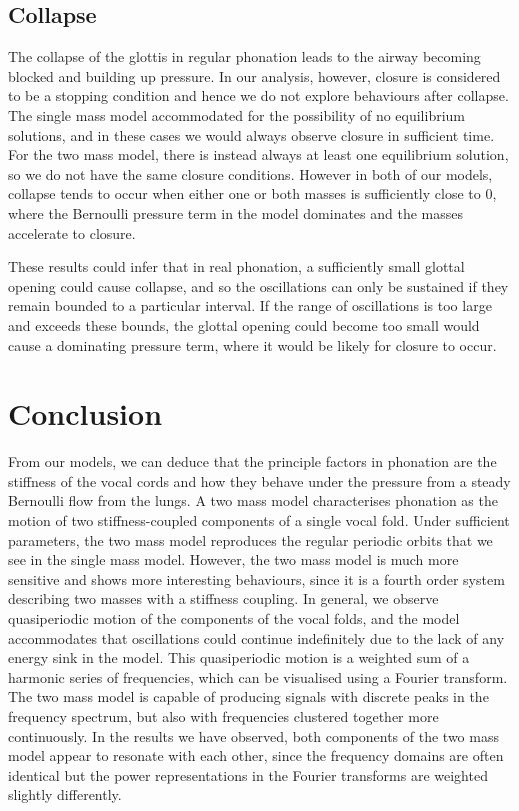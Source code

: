 \documentclass{report}
\begin{document}
\subsection{Collapse}

The collapse of the glottis in regular phonation leads to the airway becoming blocked and building up pressure.
In our analysis, however, closure is considered to be a stopping condition and hence we do not explore behaviours after collapse.
The single mass model accommodated for the possibility of no equilibrium solutions,
and in these cases we would always observe closure in sufficient time.
For the two mass model, there is instead always at least one equilibrium solution,
so we do not have the same closure conditions.
However in both of our models,
collapse tends to occur when either one or both masses is sufficiently close to $0$,
where the Bernoulli pressure term in the model dominates and the masses accelerate to closure.

These results could infer that in real phonation,
a sufficiently small glottal opening could cause collapse,
and so the oscillations can only be sustained if they remain bounded to a particular interval.
If the range of oscillations is too large and exceeds these bounds,
the glottal opening could become too small would cause a dominating pressure term,
where it would be likely for closure to occur.

\section{Conclusion}

From our models,
we can deduce that the principle factors in phonation are the stiffness of the vocal cords and how they behave under the pressure from a steady Bernoulli flow from the lungs.
A two mass model characterises phonation as the motion of two stiffness-coupled components of a single vocal fold.
Under sufficient parameters, the two mass model reproduces the regular periodic orbits that we see in the single mass model.
However, the two mass model is much more sensitive and shows more interesting behaviours,
since it is a fourth order system describing two masses with a stiffness coupling.
In general, we observe quasiperiodic motion of the components of the vocal folds,
and the model accommodates that oscillations could continue indefinitely due to the lack of any energy sink in the model.
This quasiperiodic motion is a weighted sum of a harmonic series of frequencies,
which can be visualised using a Fourier transform.
The two mass model is capable of producing signals with discrete peaks in the frequency spectrum,
but also with frequencies clustered together more continuously.
In the results we have observed,
both components of the two mass model appear to resonate with each other,
since the frequency domains are often identical but the power representations in the Fourier transforms are weighted slightly differently.
\end{document}
